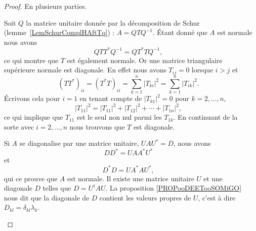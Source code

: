 \begin{proof}

    En plusieurs parties.
    \begin{subproof}
        \spitem[\ref{ItemJZhFPSi} \( \Rightarrow\) \ref{ItemJZhFPSii}]
	Soit \( Q\) la matrice unitaire donnée par la décomposition de Schur (lemme~\ref{LemSchurComplHAftTq}) : \( A=QTQ^{-1}\). Étant donné que \( A\) est normale nous avons
	\begin{equation}
		QTT^*Q^{-1}=QT^*TQ^{-1},
	\end{equation}
	ce qui montre que \( T\) est également normale. Or une matrice triangulaire supérieure normale est diagonale. En effet nous avons \( T_{ij}=0\) lorsque \( i>j\) et
	\begin{equation}
		(TT^*)_{ii}=(T^*T)_{ii}=\sum_{k=1}^n| T_{ki} |^2=\sum_{k=1}^n| T_{ik} |^2.
	\end{equation}
	Écrivons cela pour \( i=1\) en tenant compte de \( | T_{k1} |^2=0\) pour \( k=2,\ldots, n\),
	\begin{equation}
		| T_{11} |^2=| T_{11} |^2+| T_{12} |^2+\cdots+| T_{1n} |^2,
	\end{equation}
	ce qui implique que \( T_{11}\) est le seul non nul parmi les \( T_{1k}\). En continuant de la sorte avec \( i=2,\ldots, n\) nous trouvons que \( T\) est diagonale.

    \spitem[\ref{ItemJZhFPSii} \( \Rightarrow\) \ref{ItemJZhFPSi}]
	Si \( A\) se diagonalise par une matrice unitaire, \( UAU^*=D\), nous avons
	\begin{equation}
		DD^*=UAA^*U^*
	\end{equation}
	et
	\begin{equation}
		D^*D=UA^*AU^*,
	\end{equation}
	qui ce prouve que \( A\) est normale.
\spitem[\ref{ItemJZhFPSii} \( \Rightarrow\) \ref{ITEMooIIQTooQORrXP}]
    Il existe une matrice unitaire \( U\) et une diagonale \( D\) telles que \( D=U^{\dag}AU\). La proposition \ref{PROPooDEETooSOMiGO} nous dit que la diagonale de \( D\) contient les valeurs propres de \( U\), c'est à dire \( D_{kl}=\delta_{kl}\lambda_k\).


\end{subproof}
\end{proof}
